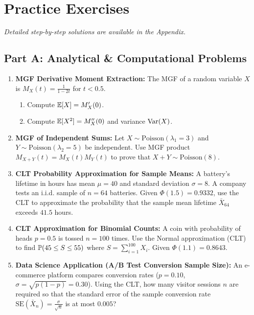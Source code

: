 \newpage
\section{Practice Exercises}
\textit{Detailed step-by-step solutions are available in the Appendix.}

\subsection*{Part A: Analytical \& Computational Problems}

\begin{enumerate}
\item \textbf{MGF Derivative Moment Extraction:} The MGF of a random variable $X$ is $M_X(t) = \frac{1}{1 - 2t}$ for $t < 0.5$.
    \begin{enumerate}
        \item Compute $\E[X] = M_X'(0)$.
        \item Compute $\E[X^2] = M_X''(0)$ and variance $\Var(X)$.
    \end{enumerate}

\item \textbf{MGF of Independent Sums:} Let $X \sim \text{Poisson}(\lambda_1 = 3)$ and $Y \sim \text{Poisson}(\lambda_2 = 5)$ be independent. Use MGF product $M_{X+Y}(t) = M_X(t) M_Y(t)$ to prove that $X + Y \sim \text{Poisson}(8)$.

\item \textbf{CLT Probability Approximation for Sample Means:} A battery's lifetime in hours has mean $\mu = 40$ and standard deviation $\sigma = 8$. A company tests an i.i.d. sample of $n = 64$ batteries. Given $\Phi(1.5) = 0.9332$, use the CLT to approximate the probability that the sample mean lifetime $\bar{X}_{64}$ exceeds $41.5$ hours.

\item \textbf{CLT Approximation for Binomial Counts:} A coin with probability of heads $p = 0.5$ is tossed $n = 100$ times. Use the Normal approximation (CLT) to find $\P(45 \le S \le 55)$ where $S = \sum_{i=1}^{100} X_i$. Given $\Phi(1.1) = 0.8643$.

\item \textbf{Data Science Application (A/B Test Conversion Sample Size):} An e-commerce platform compares conversion rates ($p = 0.10$, $\sigma = \sqrt{p(1-p)} = 0.30$). Using the CLT, how many visitor sessions $n$ are required so that the standard error of the sample conversion rate $\text{SE}(\bar{X}_n) = \frac{\sigma}{\sqrt{n}}$ is at most $0.005$?
\end{enumerate}

